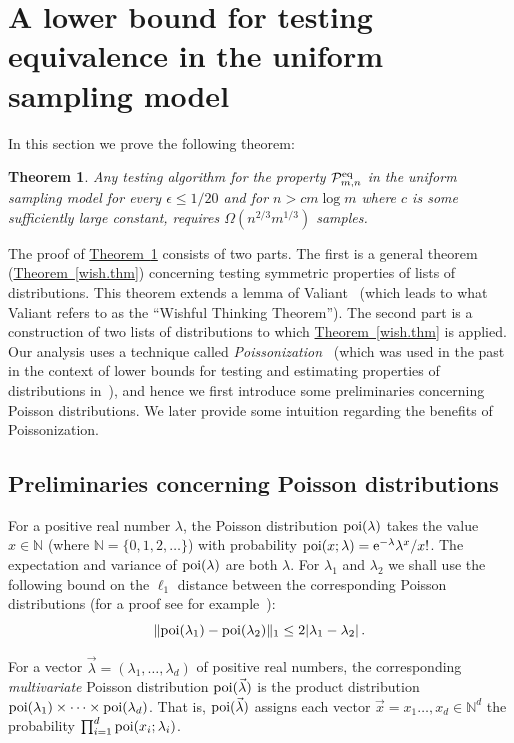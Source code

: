 \documentclass[10pt]{article}
\newtheorem{theorem}{Theorem}[section]
\theoremstyle{definition}
\numberwithin{equation}{section}
\newcommand{\expref}[2]{\texorpdfstring{\hyperref[#2]{#1~\ref{#2}}}{#1~\ref{#2}}}
\newcommand{\eee}{\mathrm e}  %
\newcommand{\eps}{\epsilon}
\newcommand{\poi}{{\rm poi}}
\newcommand{\calPidmn}{{\cal P}^{\rm eq}_{m,n}}
\newcommand{\BEQ}{\begin{equation}} \newcommand{\EEQ}{\end{equation}}
\begin{document}
\section{A lower bound for testing equivalence 
in the uniform sampling model}\label{id-lb.sec}
%
In this section we prove the following theorem:
\begin{theorem}
\label{lb1.thm}
Any testing algorithm for the property  $\calPidmn$  in the uniform sampling model
for every $\eps \leq 1/20$ and for
 $n > c m\log m$ where $c$ is some sufficiently large
constant,
%
%
requires $\Omega(n^{2/3}m^{1/3})$ samples.
%
%
%
%
\end{theorem}
The proof of \expref{Theorem}{lb1.thm} consists of two parts. The first
is a general theorem (\expref{Theorem}{wish.thm})
concerning testing  symmetric properties of lists of distributions.
%
%
This theorem extends
 a lemma of Valiant~\cite[Lem. 4.5.4]{valphd}
(which leads to what Valiant refers to as
the ``Wishful Thinking Theorem''). The second part is a construction of
two lists of distributions to which \expref{Theorem}{wish.thm} is applied.
Our analysis uses a technique called \emph{Poissonization}~\cite{szpankowski}
(which was used in the past in the context of lower bounds for testing and estimating
properties of distributions in~\cite{RRSS,val,valphd}),
and hence we first introduce some preliminaries concerning Poisson distributions.
%
We later provide some intuition regarding the benefits of Poissonization.




\subsection{Preliminaries concerning Poisson distributions}
\label{prel-poiss.subsec}
\sloppy
For a positive real number $\lambda$,
the Poisson distribution $\poi(\lambda)$ takes the value
$x \in \mathbb{N}$ (where $\mathbb{N} = \{0,1,2,\ldots\}$) with
probability $\poi(x;\lambda) = \eee^{-\lambda} \lambda^x/x!$.
The expectation and variance of $\poi(\lambda)$ are both $\lambda$.
For $\lambda_1$ and $\lambda_2$ we shall use the following bound
on the $\ell_1$ distance between the corresponding Poisson distributions
(for a proof see for example~\cite[Claim A.2]{RRSS}):
\BEQ
\|\poi(\lambda_1) - \poi(\lambda_2)\|_1 \leq 2|\lambda_1 - \lambda_2|\,.
\label{poi-stat.eq}
\EEQ

For a vector $\vec{\lambda} = (\lambda_1,\ldots,\lambda_d)$ of positive
real numbers, the corresponding \emph{multivariate} Poisson distribution
$\poi(\vec{\lambda})$ is the product distribution
$\poi(\lambda_1)\times\dots\times \poi(\lambda_d)$. That is,
$\poi(\vec{\lambda})$ assigns each vector
$\vec{x} = x_1\ldots,x_d \in \mathbb{N}^d$ the probability
$\prod_{i=1}^d \poi(x_i;\lambda_i)$.
\end{document}
